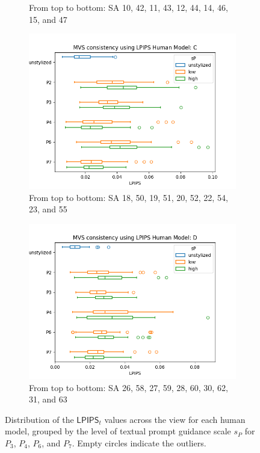 \begin{figure}[ht]
\begin{subfigure}{0.49\textwidth}
		\caption{From top to bottom: SA 10, 42, 11, 43, 12, 44, 14, 46, 15, and 47}
	\end{subfigure}
	\begin{subfigure}{0.49\textwidth}
		\includegraphics[width=\linewidth]{Figures/results/good/lpips_irene.png}
		\caption{From top to bottom: SA 18, 50, 19, 51, 20, 52, 22, 54, 23, and 55}
	\end{subfigure}
	\begin{subfigure}{0.49\textwidth}
		\includegraphics[width=\linewidth]{Figures/results/good/lpips_simon.png}
		\caption{From top to bottom: SA 26, 58, 27, 59, 28, 60, 30, 62, 31, and 63}
	\end{subfigure}
	\caption{Distribution of the $\mathsf{LPIPS}_{t}$ values across the view for each human model, grouped by the level of textual prompt guidance scale $s_P$ for $P_3$, $P_4$, $P_6$, and $P_7$. Empty circles indicate the outliers.}
	\label{fig:quantitative_distribution_lpips_good}
\end{figure}

